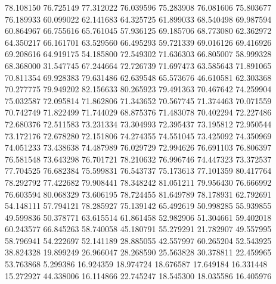 78.108150
76.725149
77.312022
76.039596
75.283908
76.081606
75.803677
76.189933
60.099022
62.141683
64.325725
61.899033
68.540498
69.987594
60.864967
66.755616
65.761045
57.936125
69.185706
68.773080
62.362972
64.350217
66.161701
63.529560
66.495293
59.721339
69.016126
69.416926
69.208616
64.919175
54.185800
72.549302
71.636303
66.805007
58.999328
68.368000
31.547745
67.244664
72.726739
71.697473
63.585643
71.891065
70.811354
69.928383
79.631486
62.639548
65.573676
46.610581
62.303368
70.277775
79.949202
82.156633
80.265923
79.491363
70.467642
74.259904
75.032587
72.095814
71.862806
71.343652
70.567745
71.374463
70.071559
70.742749
71.822499
71.744029
68.875376
71.483078
70.402294
72.227486
72.680376
72.511583
73.231334
73.304993
72.395437
73.195812
72.950544
73.172176
72.678280
72.151806
74.274355
74.551045
73.425092
74.350969
74.051233
73.438638
74.487989
76.029729
72.994626
76.691103
76.806397
76.581548
73.643298
76.701721
78.210632
76.996746
74.447323
73.372537
77.704525
76.682384
75.599831
76.543737
75.173613
77.101359
80.417764
78.292792
77.422682
79.908441
78.348242
81.051211
79.956430
76.666992
76.603594
80.068329
73.606195
78.724455
81.649789
78.178931
62.792691
54.148111
57.794121
78.285927
75.139142
65.492619
50.998285
55.939855
49.599836
50.378771
63.615514
61.861458
52.982906
51.304661
59.402018
60.243577
66.845263
58.740058
45.180791
55.279291
21.782907
49.557995
58.796941
54.222697
52.141189
28.885055
42.557997
60.265204
52.543925
38.824328
19.899249
26.966047
28.268590
25.563828
30.378811
22.459965
53.763868
5.299386
16.924359
18.974724
18.676587
17.649184
16.331448
15.272927
44.338006
16.114866
22.745247
18.545300
18.035586
16.405976
